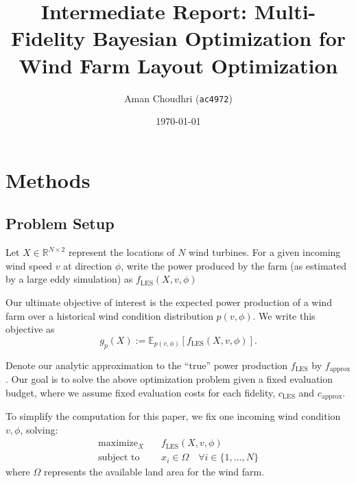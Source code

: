 \documentclass[11pt]{article}
\title{Intermediate Report: Multi-Fidelity Bayesian Optimization for Wind Farm Layout Optimization}
\author{Aman Choudhri (\texttt{ac4972})}
\date{\today}
\begin{document}
\maketitle

\section{Methods}

\subsection{Problem Setup}
Let $X \in \mathbb{R}^{N \times 2}$ represent the locations of $N$ wind turbines. 
For a given incoming wind speed $v$ at direction $\phi$, write the power produced
by the farm (as estimated by a large eddy simulation) as $f_\text{LES}(X, v, \phi)$

Our ultimate objective of interest is the expected power production of a wind farm
over a historical wind condition distribution $p(v, \phi)$. We write this objective as
\[
    g_p(X) := \mathbb{E}_{p(v, \phi)} [f_\text{LES}(X, v, \phi)]
.\] 

%
Denote our analytic approximation to the ``true'' power production
$f_\text{LES}$ by $f_\text{approx}$. Our goal is to solve the above
optimization problem given a fixed evaluation budget, where we assume fixed
evaluation costs for each fidelity, $c_\text{LES}$ and $c_\text{approx}$.

To simplify the computation for this paper, we fix one incoming wind condition $v, \phi$,
solving:
\begin{align*}
    \text{maximize}_{X}& \quad f_\text{LES}(X, v, \phi) \\
    \text{subject to}& \quad x_i \in \Omega \quad \forall i \in \{1,\ldots,N\}
\end{align*}
where $\Omega$ represents the available land area for the wind farm.
\end{document}
